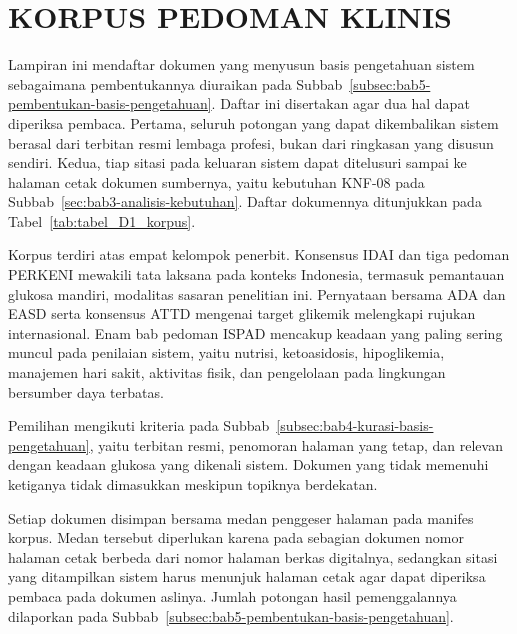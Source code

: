 \cleardoublepage
\chapter{KORPUS PEDOMAN KLINIS}
\label{lamp:korpus}

Lampiran ini mendaftar dokumen yang menyusun basis pengetahuan sistem sebagaimana pembentukannya diuraikan pada Subbab~\ref{subsec:bab5-pembentukan-basis-pengetahuan}.
Daftar ini disertakan agar dua hal dapat diperiksa pembaca. Pertama, seluruh potongan yang dapat dikembalikan sistem berasal dari terbitan resmi lembaga profesi,
bukan dari ringkasan yang disusun sendiri. Kedua, tiap sitasi pada keluaran sistem dapat ditelusuri sampai ke halaman cetak dokumen sumbernya, yaitu kebutuhan
KNF-08 pada Subbab~\ref{sec:bab3-analisis-kebutuhan}. Daftar dokumennya ditunjukkan pada Tabel~\ref{tab:tabel_D1_korpus}.



Korpus terdiri atas empat kelompok penerbit. Konsensus IDAI dan tiga pedoman PERKENI mewakili tata laksana pada konteks Indonesia, termasuk pemantauan glukosa
mandiri, modalitas sasaran penelitian ini. Pernyataan bersama ADA dan EASD serta konsensus ATTD mengenai target glikemik melengkapi rujukan internasional.
Enam bab pedoman ISPAD mencakup keadaan yang paling sering muncul pada penilaian sistem, yaitu nutrisi, ketoasidosis,
hipoglikemia, manajemen hari sakit, aktivitas fisik, dan pengelolaan pada lingkungan bersumber daya terbatas.

Pemilihan mengikuti kriteria pada Subbab~\ref{subsec:bab4-kurasi-basis-pengetahuan}, yaitu terbitan resmi, penomoran halaman yang tetap, dan relevan dengan
keadaan glukosa yang dikenali sistem. Dokumen yang tidak memenuhi ketiganya tidak dimasukkan meskipun topiknya berdekatan.

Setiap dokumen disimpan bersama medan penggeser halaman pada manifes korpus. Medan tersebut diperlukan karena pada sebagian dokumen nomor halaman cetak berbeda
dari nomor halaman berkas digitalnya, sedangkan sitasi yang ditampilkan sistem harus menunjuk halaman cetak agar dapat diperiksa pembaca pada dokumen aslinya.
Jumlah potongan hasil pemenggalannya dilaporkan pada Subbab~\ref{subsec:bab5-pembentukan-basis-pengetahuan}.
